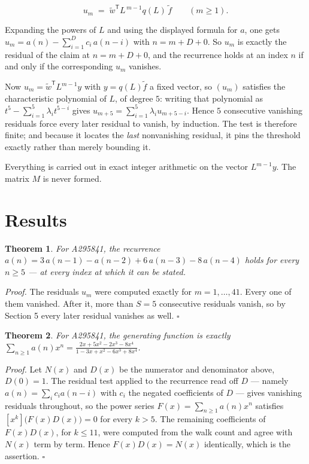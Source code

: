 \documentclass[11pt]{article}
\newtheorem{theorem}{Theorem}
\theoremstyle{definition}
\begin{document}
\[u_m \;=\; \tilde w^{\mathsf T} L^{\,m-1} q(L)\,\tilde f \qquad (m \ge 1).\]

Expanding the powers of $L$ and using the displayed formula for $a$, one gets $u_m = a(n) - \sum_{i=1}^{D} c_i\,a(n-i)$ with $n = m + D + 0$. So $u_m$ is exactly the residual of the claim at $n = m + D + 0$, and the recurrence holds at an index $n$ if and only if the corresponding $u_m$ vanishes.

Now $u_m = \tilde w^{\mathsf T} L^{m-1} y$ with $y = q(L)\tilde f$ a fixed vector, so $(u_m)$ satisfies the characteristic polynomial of $L$, of degree $5$: writing that polynomial as $t^{5} - \sum_{i=1}^{5} \lambda_i t^{5-i}$ gives $u_{m+5} = \sum_{i=1}^{5} \lambda_i u_{m+5-i}$. Hence $5$ consecutive vanishing residuals force every later residual to vanish, by induction. The test is therefore finite; and because it locates the {\itshape last} nonvanishing residual, it pins the threshold exactly rather than merely bounding it.

Everything is carried out in exact integer arithmetic on the vector $L^{m-1}y$. The matrix $M$ is never formed.

\section{Results}

\begin{theorem} For A295841, the recurrence $a(n) = 3\,a(n-1) - a(n-2) + 6\,a(n-3) - 8\,a(n-4)$ holds for every $n \ge 5$ --- at every index at which it can be stated.\end{theorem}

{\itshape Proof.} The residuals $u_m$ were computed exactly for $m = 1,\dots,41$. Every one of them vanished. After it, more than $S = 5$ consecutive residuals vanish, so by Section 5 every later residual vanishes as well. $\square$

\begin{theorem} For A295841, the generating function is exactly $\sum_{n\ge 1} a(n)x^n = \frac{2x + 5x^{2} - 2x^{3} - 8x^{4}}{1 - 3x + x^{2} - 6x^{3} + 8x^{4}}$.\end{theorem}

{\itshape Proof.} Let $N(x)$ and $D(x)$ be the numerator and denominator above, $D(0)=1$. The residual test applied to the recurrence read off $D$ --- namely $a(n) = \sum_i c_i a(n-i)$ with $c_i$ the negated coefficients of $D$ --- gives vanishing residuals throughout, so the power series $F(x)=\sum_{n\ge 1}a(n)x^n$ satisfies $[x^k]\bigl(F(x)D(x)\bigr) = 0$ for every $k > 5$. The remaining coefficients of $F(x)D(x)$, for $k \le 11$, were computed from the walk count and agree with $N(x)$ term by term. Hence $F(x)D(x) = N(x)$ identically, which is the assertion. $\square$
\end{document}
